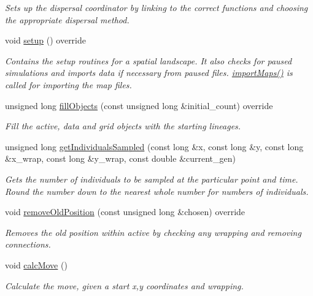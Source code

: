 \begin{DoxyCompactItemize}
\begin{DoxyCompactList}\small\item\em Sets up the dispersal coordinator by linking to the correct functions and choosing the appropriate dispersal method. \end{DoxyCompactList}\item 
void \hyperlink{class_spatial_tree_ae97336318c81e182e9f445f7efdbff8d}{setup} () override
\begin{DoxyCompactList}\small\item\em Contains the setup routines for a spatial landscape. It also checks for paused simulations and imports data if necessary from paused files. \hyperlink{class_spatial_tree_ab9603c25cd1c8466d1e4bfa3f73f191f}{import\+Maps()} is called for importing the map files. \end{DoxyCompactList}\item 
unsigned long \hyperlink{class_spatial_tree_a030ece1d0756057e56f4272510d3e567}{fill\+Objects} (const unsigned long \&initial\+\_\+count) override
\begin{DoxyCompactList}\small\item\em Fill the active, data and grid objects with the starting lineages. \end{DoxyCompactList}\item 
unsigned long \hyperlink{class_spatial_tree_a46d31dc58b01f2666e90078e95b2a25d}{get\+Individuals\+Sampled} (const long \&x, const long \&y, const long \&x\+\_\+wrap, const long \&y\+\_\+wrap, const double \&current\+\_\+gen)
\begin{DoxyCompactList}\small\item\em Gets the number of individuals to be sampled at the particular point and time. Round the number down to the nearest whole number for numbers of individuals. \end{DoxyCompactList}\item 
void \hyperlink{class_spatial_tree_ae694bde4ab31b51c13c4a96f9a86a8ba}{remove\+Old\+Position} (const unsigned long \&chosen) override
\begin{DoxyCompactList}\small\item\em Removes the old position within active by checking any wrapping and removing connections. \end{DoxyCompactList}\item 
void \hyperlink{class_spatial_tree_ac7202eff84dfe8931374cc236efb9133}{calc\+Move} ()
\begin{DoxyCompactList}\small\item\em Calculate the move, given a start x,y coordinates and wrapping. \end{DoxyCompactList}\item 

\end{DoxyCompactItemize}
